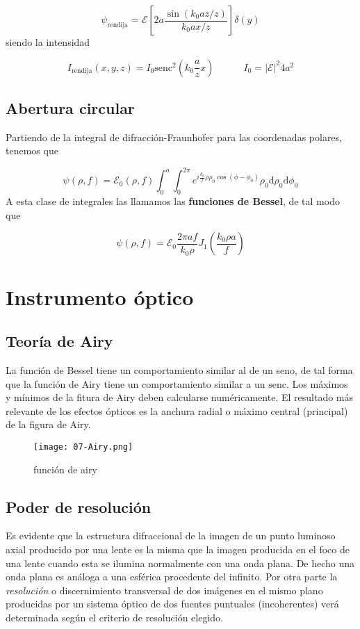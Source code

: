 \documentclass[12pt,a4paper]{book}
\numberwithin{equation}{section}
\numberwithin{figure}{section}
\newcommand{\tquad}{\quad \quad \quad}
\newcommand{\parentesis}[1]{\left( #1  \right)}
\newcommand{\ccorchetes}[1]{\left[ #1  \right]}
\newcommand{\D}{\mathrm{d}}
\newcommand{\1}{_{(1)}}
\newcommand{\2}{_{(2)}}
\newcommand{\sinc}{\mathrm{senc} }
\newcommand{\Ecal}{\mathcal{E}}
\theoremstyle{definition}
\begin{document}
\begin{equation}
    \psi_{\mathrm{rendija}} =  \Ecal \ccorchetes{2a \frac{\sin (k_0 a z /z)}{k_0ax/z}} \delta (y)
\end{equation}
siendo la intensidad

\begin{equation}
    I_{\mathrm{rendija}}(x,y,z) = I_0 \sinc^2 \parentesis{k_0 \frac{a}{z}x} \tquad I_0 = |\Ecal|^2 4a^2
\end{equation}


\subsection{Abertura circular}

Partiendo de la integral de difracción-Fraunhofer para las coordenadas polares, tenemos que

\begin{equation}
    \psi (\rho,f) = \Ecal_0 (\rho,f) \int_0^a \int_0^{2\pi} e^{i\frac{k_0}{f} \rho \rho_0 \cos (\phi-\phi_0)} \rho_0 \D \rho_0 \D \phi_0
\end{equation}
A esta clase de integrales las llamamos las \textbf{funciones de Bessel}, de tal modo que 

\begin{equation}
    \psi (\rho,f) = \Ecal_0 \frac{2 \pi a f}{k_0 \rho} J_1 \parentesis{\frac{k_0 \rho a}{f}}
\end{equation}

\section{Instrumento óptico}
\subsection{Teoría de Airy}

La función de Bessel tiene un comportamiento similar al de un seno, de tal forma que la función de Airy tiene un comportamiento similar a un $\sinc$. Los máximos y mínimos de la fitura de Airy deben calcularse numéricamente. El resultado más relevante de los efectos ópticos es la anchura radial o máximo central (principal) de la figura de Airy. 

\begin{figure}[h!]
    \centering
    \texttt{[image: 07-Airy.png]}
    \caption{función de airy}
    \label{Fig:07.3-01}
\end{figure}


\subsection{Poder de resolución}
Es evidente que la estructura difraccional de la imagen de un punto luminoso axial producido por una lente es la misma que la imagen producida en el foco de una lente cuando esta se ilumina normalmente con una onda plana. De hecho una onda plana es análoga a una esférica procedente del infinito. Por otra parte la \textit{resolución} o discernimiento transversal de dos imágenes en el mismo plano producidas por un sistema óptico de dos fuentes puntuales (incoherentes) verá determinada según el criterio de resolución elegido. 
\end{document}
